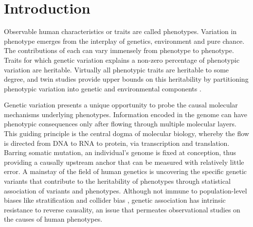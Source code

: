 %
%


\chapter{Introduction}
\label{ch:introduction}

\begin{outline}

Observable human characteristics or traits are called phenotypes.
Variation in phenotype emerges from the interplay of genetics, environment and pure chance.
The contributions of each can vary immensely from phenotype to phenotype.
Traits for which genetic variation explains a non-zero percentage of phenotypic variation are heritable.
Virtually all phenotypic traits are heritable to some degree, 
and twin studies provide upper bounds on this heritability by partitioning phenotypic variation into genetic and environmental components \autocite{polderman2015MetaanalysisHeritabilityHuman}.

Genetic variation presents a unique opportunity to probe the causal molecular mechanisms underlying phenotypes.
Information encoded in the genome can have phenotypic consequences only after flowing through multiple molecular layers.
This guiding principle is the central dogma of molecular biology, whereby the flow is directed from DNA to RNA to protein, via transcription and translation.
Barring somatic mutation, an individual's genome is fixed at conception, thus providing a causally upstream anchor that can be measured with relatively little error.
A mainstay of the field of human genetics is uncovering the specific genetic variants that contribute to the heritability of phenotypes through statistical association of variants and phenotypes.
Although not immune to population-level biases like stratification \autocite{lawson2020PopulationStructureGenetic} and collider bias \autocite{day2016RobustExampleCollider},
genetic association has intrinsic resistance to reverse causality, an issue that permeates observational studies on the causes of human phenotypes.


\end{outline}
